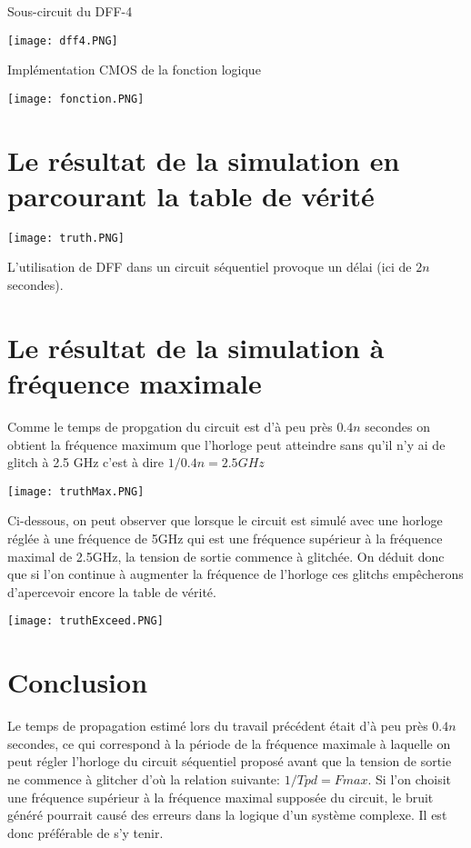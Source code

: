 \documentclass{homeworg}
\begin{document}
\center Sous-circuit du DFF-4
\begin{center}
    \texttt{[image: dff4.PNG]}\\
\end{center}

Implémentation CMOS de la fonction logique
\begin{center}
    \texttt{[image: fonction.PNG]}
\end{center}
\newpage

\section{Le résultat de la simulation en parcourant la table de vérité}
\begin{center}
    \texttt{[image: truth.PNG]}
\end{center}
L'utilisation de DFF dans un circuit séquentiel provoque un délai (ici de $2n$ secondes).

\section{Le résultat de la simulation à fréquence maximale}
Comme le temps de propgation du circuit est d'à peu près $0.4n$ secondes on obtient la fréquence maximum que l'horloge peut atteindre sans qu'il n'y ai de glitch à 2.5 GHz c'est à dire $1 / 0.4n = 2.5GHz$
\begin{center}
    \texttt{[image: truthMax.PNG]}
\end{center}

Ci-dessous, on peut observer que lorsque le circuit est simulé avec une horloge réglée à une fréquence de 5GHz qui est une fréquence supérieur à la fréquence maximal de 2.5GHz, la tension de sortie commence à glitchée. On déduit donc que si l'on continue à augmenter la fréquence de l'horloge ces glitchs empêcherons d'apercevoir encore la table de vérité.
\begin{center}
    \texttt{[image: truthExceed.PNG]}
\end{center}
\newpage

\section{Conclusion}
Le temps de propagation estimé lors du travail précédent était d'à peu près $0.4n$ secondes, ce qui correspond à la période de la fréquence maximale à laquelle on peut régler l'horloge du circuit séquentiel proposé avant que la tension de sortie ne commence à glitcher d'où la relation suivante: $1/Tpd = Fmax$. Si l'on choisit une fréquence supérieur à la fréquence maximal supposée du circuit, le bruit généré pourrait causé des erreurs dans la logique d'un système complexe. Il est donc préférable de s'y tenir.
\end{document}
